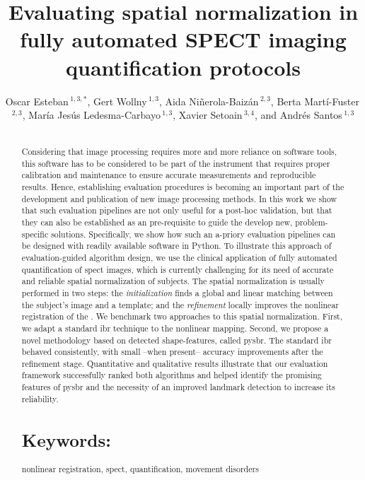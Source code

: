 \documentclass{frontiers}
\def\firstAuthorLast{Esteban {et~al}} %
\def\Authors{Oscar Esteban\,$^{1,3,*}$, 
             Gert Wollny\,$^{1,3}$, 
             Aida Ni\~nerola-Baiz\'an\,$^{2,3}$, 
             Berta Mart\'i-Fuster\,$^{2,3}$,
             Mar\'ia Jes\'us Ledesma-Carbayo\,$^{1,3}$, 
             Xavier Setoain\,$^{3,4}$, and 
             Andr\'es Santos\,$^{1,3}$}
\begin{document}
\onecolumn
{}

\title[Evaluating normalization]%
  {Evaluating spatial normalization in fully automated SPECT imaging quantification protocols}

\author[\firstAuthorLast ]{\Authors}
\address{}
\correspondance{}
\editor{}

\maketitle


\begin{abstract}
\section{}
Considering that image processing requires more and more reliance on software tools, 
  this software has to be considered to be part of the instrument that requires 
  proper calibration and maintenance to ensure accurate measurements and reproducible 
  results. 
Hence, establishing evaluation procedures is becoming an important 
  part of the development and publication of new image processing methods.
In this work we show that such evaluation pipelines are not only useful for a post-hoc validation, 
  but that they can also be established as an pre-requisite 
  to guide the develop new, problem-specific solutions. 
Specifically, we show how such an a-priory  evaluation pipelines can be designed
  with readily available software in Python.
To illustrate this approach of evaluation-guided algorithm design, we use the clinical 
  application of fully automated quantification of \gls*{spect} images, which is currently challenging
  for its need of accurate and reliable spatial normalization of subjects.
The spatial normalization is usually performed in two steps: the
  \emph{initialization} finds a global and linear matching between
  the subject's image and a template; and the \emph{refinement}
  locally improves the nonlinear registration of the .
We benchmark two approaches to this spatial normalization.
First, we adapt a standard \acrlong*{ibr} technique to the nonlinear mapping.
Second, we propose a novel methodology based on detected shape-features,
  called \gls*{pysbr}.
The standard \acrlong{ibr} behaved consistently,
  with small --when present-- accuracy improvements after the refinement stage.
Quantitative and qualitative results illustrate that our evaluation framework
  successfully ranked both algorithms and helped identify the promising features
  of \gls*{pysbr} and the necessity of an improved landmark detection to
  increase its reliability.
\tiny
  \section{Keywords:} nonlinear registration, spect, quantification, movement disorders
\end{abstract}
\end{document}

